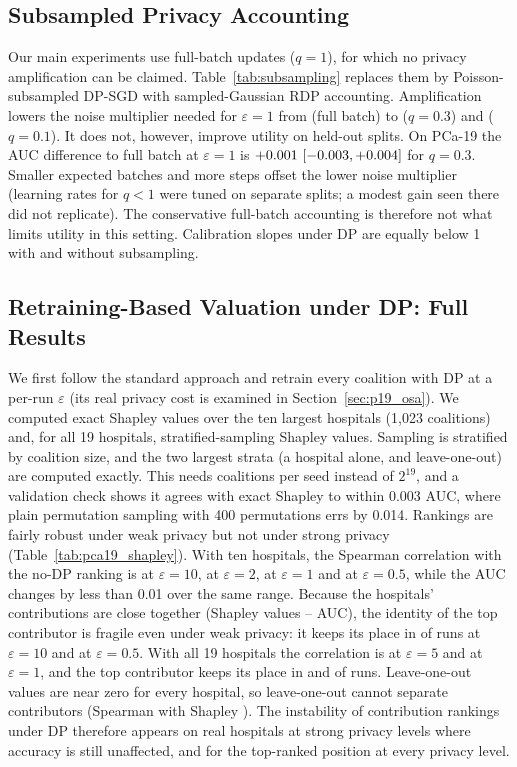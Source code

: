 \subsection{Subsampled Privacy Accounting}
\label{sec:p19_subsampling}
Our main experiments use full-batch updates ($q=1$), for which no privacy amplification can be claimed. Table~\ref{tab:subsampling} replaces them by Poisson-subsampled DP-SGD with sampled-Gaussian RDP accounting. Amplification lowers the noise multiplier needed for $\varepsilon=1$ from \ssSigFull{} (full batch) to \ssSigThree{} ($q=0.3$) and \ssSigOne{} ($q=0.1$). It does not, however, improve utility on held-out splits. On PCa-19 the AUC difference to full batch at $\varepsilon=1$ is $+0.001\ [-0.003, +0.004]$ for $q=0.3$. Smaller expected batches and more steps offset the lower noise multiplier (learning rates for $q<1$ were tuned on separate splits; a modest gain seen there did not replicate). The conservative full-batch accounting is therefore not what limits utility in this setting. Calibration slopes under DP are equally below 1 with and without subsampling.




\subsection{Retraining-Based Valuation under DP: Full Results}
\label{sec:retrain_full}
We first follow the standard approach and retrain every coalition with DP at a per-run $\varepsilon$ (its real privacy cost is examined in Section~\ref{sec:p19_osa}). We computed exact Shapley values over the ten largest hospitals (1{,}023 coalitions) and, for all 19 hospitals, stratified-sampling Shapley values. Sampling is stratified by coalition size, and the two largest strata (a hospital alone, and leave-one-out) are computed exactly. This needs \pShNineCoal{} coalitions per seed instead of $2^{19}$, and a validation check shows it agrees with exact Shapley to within 0.003 AUC, where plain permutation sampling with 400 permutations errs by 0.014. Rankings are fairly robust under weak privacy but not under strong privacy (Table~\ref{tab:pca19_shapley}). With ten hospitals, the Spearman correlation with the no-DP ranking is \pShRhoTen{} at $\varepsilon=10$, \pShRhoTwo{} at $\varepsilon=2$, \pShRhoOne{} at $\varepsilon=1$ and \pShRhoHalf{} at $\varepsilon=0.5$, while the AUC changes by less than 0.01 over the same range. Because the hospitals' contributions are close together (Shapley values \pShPhiMin--\pShPhiMax{} AUC), the identity of the top contributor is fragile even under weak privacy: it keeps its place in \pShTSTen{} of runs at $\varepsilon=10$ and \pShTSHalf{} at $\varepsilon=0.5$. With all 19 hospitals the correlation is \pShNineRhoFive{} at $\varepsilon=5$ and \pShNineRhoOne{} at $\varepsilon=1$, and the top contributor keeps its place in \pShNineTSFive{} and \pShNineTSOne{} of runs. Leave-one-out values are near zero for every hospital, so leave-one-out cannot separate contributors (Spearman with Shapley \pShLooRho). The instability of contribution rankings under DP therefore appears on real hospitals at strong privacy levels where accuracy is still unaffected, and for the top-ranked position at every privacy level.




